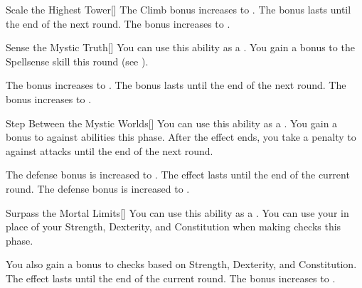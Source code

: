 {\begin{freeability}{Scale the Highest Tower}[]
                \rankline
                 The Climb bonus increases to .
                 The bonus lasts until the end of the next round.
                 The bonus increases to .
            \end{freeability}

            \begin{freeability}{Sense the Mystic Truth}[]
                You can use this ability as a .
                You gain a  bonus to the Spellsense skill this round (see ).

                \rankline
                 The bonus increases to .
                 The bonus lasts until the end of the next round.
                 The bonus increases to .
            \end{freeability}

            \begin{freeability}{Step Between the Mystic Worlds}[]
                You can use this ability as a .
                You gain a  bonus to  against  abilities this phase.
                After the effect ends, you take a  penalty to  against  attacks until the end of the next round.

                \rankline
                 The defense bonus is increased to .
                 The effect lasts until the end of the current round.
                 The defense bonus is increased to .
            \end{freeability}

            \begin{freeability}{Surpass the Mortal Limits}[]
                You can use this ability as a .
                You can use your  in place of your Strength, Dexterity, and Constitution when making checks this phase.

                \rankline
                 You also gain a  bonus to checks based on Strength, Dexterity, and Constitution.
                 The effect lasts until the end of the current round.
                 The bonus increases to .
            \end{freeability}

        }

